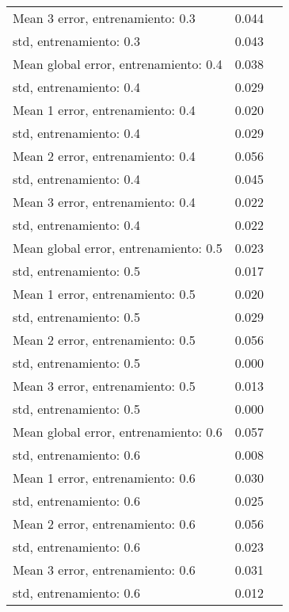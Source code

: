 \begin{longtable}{p{4cm}|p{1.5cm}|p{1.5cm}}
Mean 3 error, entrenamiento: 0.3      &              0.044 \\
std, entrenamiento: 0.3               &              0.043 \\
Mean global error, entrenamiento: 0.4 &              0.038 \\
std, entrenamiento: 0.4               &              0.029 \\
Mean 1 error, entrenamiento: 0.4      &              0.020 \\
std, entrenamiento: 0.4               &              0.029 \\
Mean 2 error, entrenamiento: 0.4      &              0.056 \\
std, entrenamiento: 0.4               &              0.045 \\
Mean 3 error, entrenamiento: 0.4      &              0.022 \\
std, entrenamiento: 0.4               &              0.022 \\
Mean global error, entrenamiento: 0.5 &              0.023 \\
std, entrenamiento: 0.5               &              0.017 \\
Mean 1 error, entrenamiento: 0.5      &              0.020 \\
std, entrenamiento: 0.5               &              0.029 \\
Mean 2 error, entrenamiento: 0.5      &              0.056 \\
std, entrenamiento: 0.5               &              0.000 \\
Mean 3 error, entrenamiento: 0.5      &              0.013 \\
std, entrenamiento: 0.5               &              0.000 \\
Mean global error, entrenamiento: 0.6 &              0.057 \\
std, entrenamiento: 0.6               &              0.008 \\
Mean 1 error, entrenamiento: 0.6      &              0.030 \\
std, entrenamiento: 0.6               &              0.025 \\
Mean 2 error, entrenamiento: 0.6      &              0.056 \\
std, entrenamiento: 0.6               &              0.023 \\
Mean 3 error, entrenamiento: 0.6      &              0.031 \\
std, entrenamiento: 0.6               &              0.012 \\

\end{longtable}
